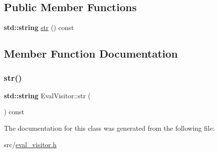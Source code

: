 \subsection*{Public Member Functions}
\begin{DoxyCompactItemize}
\item 
\textbf{ std\+::string} \hyperlink{class_eval_visitor_a999cfe6d55d85b27a6dca7c5f8c2b07e}{str} () const
\end{DoxyCompactItemize}


\subsection{Member Function Documentation}
\mbox{\label{class_eval_visitor_a999cfe6d55d85b27a6dca7c5f8c2b07e}} 
\subsubsection{\texorpdfstring{str()}{str()}}
{\footnotesize\ttfamily \textbf{ std\+::string} Eval\+Visitor\+::str (\begin{DoxyParamCaption}{ }\end{DoxyParamCaption}) const\hspace{0.3cm}{\ttfamily [inline]}}



The documentation for this class was generated from the following file\+:\begin{DoxyCompactItemize}
\item 
src/\hyperlink{eval__visitor_8h}{eval\+\_\+visitor.\+h}\end{DoxyCompactItemize}
